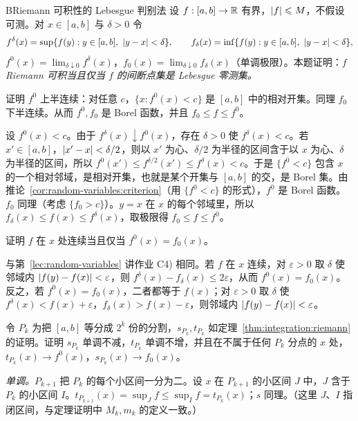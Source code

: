 \begin{probleme}{B}{Riemann 可积性的 Lebesgue 判别法}
设 $f:[a,b]\to\mathbb{R}$ 有界，$\lvert f\rvert\leqslant M$，不假设可测。对 $x\in[a,b]$ 与 $\delta>0$ 令
\[
f^\delta(x)=\sup\{f(y):y\in[a,b],\ \abs{y-x}<\delta\},\qquad f_\delta(x)=\inf\{f(y):y\in[a,b],\ \abs{y-x}<\delta\},
\]
$f^0(x)=\lim_{\delta\downarrow0}f^\delta(x)$，$f_0(x)=\lim_{\delta\downarrow0}f_\delta(x)$（单调极限）。本题证明：\emph{$f$ Riemann 可积当且仅当 $f$ 的间断点集是 Lebesgue 零测集。}
\begin{questions}
\item 证明 $f^0$ 上半连续：对任意 $c$，$\{x:f^0(x)<c\}$ 是 $[a,b]$ 中的相对开集。同理 $f_0$ 下半连续。从而 $f^0,f_0$ 是 Borel 函数，并且 $f_0\leqslant f\leqslant f^0$。
\begin{solution}
设 $f^0(x)<c$。由于 $f^\delta(x)\downarrow f^0(x)$，存在 $\delta>0$ 使 $f^\delta(x)<c$。若 $x'\in[a,b]$，$\lvert x'-x\rvert<\delta/2$，则以 $x'$ 为心、$\delta/2$ 为半径的区间含于以 $x$ 为心、$\delta$ 为半径的区间，所以 $f^0(x')\leqslant f^{\delta/2}(x')\leqslant f^\delta(x)<c$。于是 $\{f^0<c\}$ 包含 $x$ 的一个相对邻域，是相对开集，也就是某个开集与 $[a,b]$ 的交，是 Borel 集。由推论~\ref{cor:random-variables:criterion}（用 $\{f^0<c\}$ 的形式），$f^0$ 是 Borel 函数。$f_0$ 同理（考虑 $\{f_0>c\}$）。$y=x$ 在 $x$ 的每个邻域里，所以 $f_\delta(x)\leqslant f(x)\leqslant f^\delta(x)$，取极限得 $f_0\leqslant f\leqslant f^0$。
\end{solution}
\item 证明 $f$ 在 $x$ 处连续当且仅当 $f^0(x)=f_0(x)$。
\begin{solution}
与第~\ref{lec:random-variables} 讲作业 C4) 相同。若 $f$ 在 $x$ 连续，对 $\varepsilon>0$ 取 $\delta$ 使邻域内 $\lvert f(y)-f(x)\rvert<\varepsilon$，则 $f^\delta(x)-f_\delta(x)\leqslant2\varepsilon$，从而 $f^0(x)=f_0(x)$。反之，若 $f^0(x)=f_0(x)$，二者都等于 $f(x)$；对 $\varepsilon>0$ 取 $\delta$ 使 $f^\delta(x)<f(x)+\varepsilon$，$f_\delta(x)>f(x)-\varepsilon$，则邻域内 $\lvert f(y)-f(x)\rvert<\varepsilon$。
\end{solution}
\item 令 $P_k$ 为把 $[a,b]$ 等分成 $2^k$ 份的分割，$s_{P_k},t_{P_k}$ 如定理~\ref{thm:integration:riemann} 的证明。证明 $s_{P_k}$ 单调不减，$t_{P_k}$ 单调不增，并且在不属于任何 $P_k$ 分点的 $x$ 处，$t_{P_k}(x)\to f^0(x)$，$s_{P_k}(x)\to f_0(x)$。
\begin{solution}
\emph{单调。}$P_{k+1}$ 把 $P_k$ 的每个小区间一分为二。设 $x$ 在 $P_{k+1}$ 的小区间 $J$ 中，$J$ 含于 $P_k$ 的小区间 $I$。$t_{P_{k+1}}(x)=\sup_Jf\leqslant\sup_If=t_{P_k}(x)$；$s$ 同理。（这里 $J$、$I$ 指闭区间，与定理证明中 $M_k,m_k$ 的定义一致。）


\end{solution}
\end{questions}
\end{probleme}
